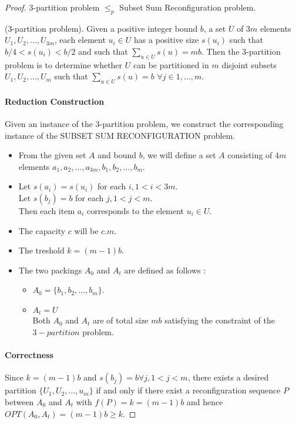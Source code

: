\begin{proof} $3$-partition problem $\leq_p$ Subset Sum Reconfiguration problem.

\begin{defn}{($3$-partition problem).} Given a positive integer bound $b$, a set $U$ of $3m$ elements $U_1,U_2, \dots, U_{3m}$, each element $u_i \in U$ has a positive size $s(u_i)$ such that $b/4 < s(u_i) < b/2$ and such that $\sum_{u \in U} s(u) = mb$. Then the $3$-partition problem is to determine whether $U$ can be partitioned in $m$ disjoint subsets
$U_1,U_2, \dots, U_{m}$ such that $\sum_{u \in U} s(u) = b$  $\forall j \in 1,\dots, m$.
\end{defn}

\paragraph{Reduction Construction} Given an instance of the $3$-partition problem, we construct the corresponding instance of the SUBSET SUM RECONFIGURATION problem.
\begin{itemize}
    \item From the given set $A$ and bound $b$, we will define a set $A$ consisting of $4m$ elements $a_1, a_2,\dots,a_{3m},b_1,b_2,\dots,b_m$.
    \item Let $s(a_i) = s(u_i)$ for each $i, 1 < i < 3m$. \\ Let $s(b_j) = b $ for each $j, 1 < j < m$. \\ Then each item $a_i$ corresponds to the element $u_i \in U$.
    \item The capacity $c$ will be $c.m$.
    \item The treshold $k = (m-1)b$.
    \item The two packings $A_0$ and $A_t$ are defined as follows :
    \begin{itemize}
        \item $A_0 = \{b_1, b_2,\dots, b_m\}$.
        \item $A_t = U$ \\ Both $A_0$ and $A_t$ are of total size $mb$ satisfying the constraint of the $3-partition$ problem.
    \end{itemize}
\end{itemize}

\paragraph{Correctness} Since $k = (m-1)b$ and $s(b_j) = b \forall j, 1 < j < m$, there exists a desired partition $\{U_1, U_2,\dots,u_m\}$ if and only if there exist a reconfiguration sequence $P$ between $A_0$ and $A_t$ with $f(P) = k = (m-1)b$ and hence $OPT(A_0, A_t) = (m-1)b \geq k$. 
\end{proof}

